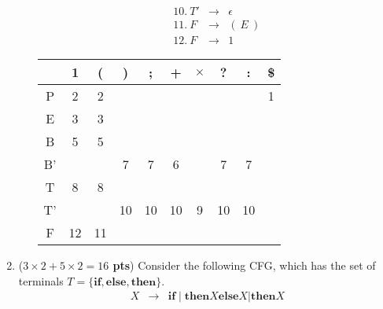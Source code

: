 \documentclass[10pt]{exam}
\newcommand {\pts}[1]{({\bf #1 pts})}
\begin{document}
\begin{enumerate}
\begin{enumerate}
{\[\begin{array}{cll}
                      10.\ T'  & \rightarrow & \epsilon          \\
                      11.\ F   & \rightarrow & (\ E\ )           \\
                      12.\ F   & \rightarrow & 1
                    \end{array}\]
                  \begin{tabular}{|c|c|c|c|c|c|c|c|c|c|}
                    \hline
                       & 1  & (  & )  & ;  & +  & $\times$ & ?  & :  & \$ \\
                    \hline
                    P  & 2  & 2  &    &    &    &          &    &    & 1  \\
                    \hline
                    E  & 3  & 3  &    &    &    &          &    &    &    \\
                    \hline
                    B  & 5  & 5  &    &    &    &          &    &    &    \\
                    \hline
                    B' &    &    & 7  & 7  & 6  &          & 7  & 7  &    \\
                    \hline
                    T  & 8  & 8  &    &    &    &          &    &    &    \\
                    \hline
                    T' &    &    & 10 & 10 & 10 & 9        & 10 & 10 &    \\
                    \hline
                    F  & 12 & 11 &    &    &    &          &    &    &    \\
                    \hline
                  \end{tabular}
                }
        \end{enumerate}

  \item \pts{$3\times 2+5\times 2 =16$} Consider the following CFG, which has the set of terminals
        $T = \{ \textbf{if}, \textbf{else} , \textbf{then} \}$.
        \[\begin{array}{cll}
            X & \rightarrow & \textbf{if} \mid \textbf{then} X \textbf{else} X |  \textbf{then} X
          \end{array}\]

        \begin{enumerate}


\end{enumerate}
\end{enumerate}
\end{document}
